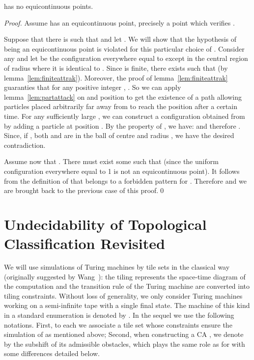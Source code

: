 \documentclass{llncs}
\begin{document}
\begin{proposition}
  \label{prop:noequ}
   has no equicontinuous points.
\end{proposition}
\begin{proof}
  Assume  has an equicontinuous point, precisely a point  which
  verifies .

  Suppose that there is  such that  and let
  . We will show that the
  hypothesis of  being an equicontinuous point is violated for this
  particular choice of . Consider any  and let
   be the configuration everywhere equal to  except in the
  central region of radius 
  where it is identical to . Since  is finite, there exists
   such that  (by
  lemma~\ref{lem:finiteattrak}).  Moreover, the proof of
  lemma~\ref{lem:finiteattrak} guaranties that for any positive
  integer , . So we can apply
  lemma~\ref{lem:partattack} on  and position  to get the
  existence of a path  allowing particles placed arbitrarily
  far away from  to reach the position  after a certain
  time. For any sufficiently large , we can construct a
  configuration  obtained from  by adding a particle at
  position . By the property of , we have:
   and
  therefore . Since, if
  , both  and  are in
  the ball of centre  and radius , we have the desired
  contradiction.

  Assume now that . There must exist
  some  such that  (since the uniform
  configuration everywhere equal to 1 is not an equicontinuous point).
  It follows from the definition of  that  belongs to a
  forbidden pattern for . Therefore
   and we are brought back to the
  previous case of this proof.\qed
\end{proof}

\section{Undecidability of Topological Classification Revisited}
\label{sec:classif}



We will use simulations of Turing machines by tile sets in the
classical way (originally suggested by Wang~\cite{Wang}): the tiling
represents the space-time diagram of the computation and the
transition rule of the Turing machine are converted into tiling
constraints.  Without loss of generality, we only consider Turing
machines working on a semi-infinite tape with a single final state.
The  machine of this kind in a standard enumeration is denoted
by .  In the sequel we use the following notations.
First, to each  we associate a tile set 
whose constraints ensure the simulation of  as mentioned
above; Second, when constructing a CA , we denote by
 the subshift of its admissible obstacles, which plays
the same role as  for  with some differences detailed
below.
\end{document}

